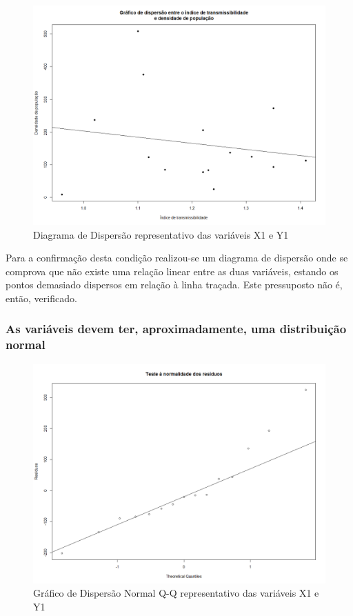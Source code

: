 \documentclass[conference]{IEEEtran}
\begin{document}
\begin{figure}[htbp]
\centerline{\includegraphics[width=0.95\columnwidth]{images/03.a.2.png}}
\caption{Diagrama de Dispersão representativo das variáveis X1 e Y1}
\label{fig}
\end{figure}

Para a confirmação desta condição realizou-se um diagrama de dispersão onde se comprova que não existe uma relação linear entre as duas variáveis, estando os pontos demasiado dispersos em relação à linha traçada. Este pressuposto não é, então, verificado.

\subsubsection{As variáveis devem ter, aproximadamente, uma distribuição normal}

\begin{figure}[htbp]
\centerline{\includegraphics[width=0.95\columnwidth]{images/03.a.3.png}}
\caption{Gráfico de Dispersão Normal Q-Q representativo das variáveis X1 e Y1}
\label{fig}
\end{figure}
\end{document}

